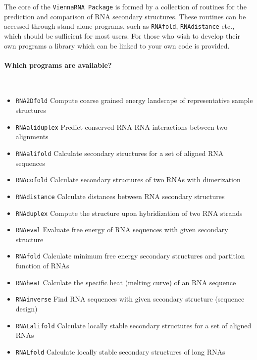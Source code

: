 \documentclass[]{article}
\let\oldparagraph\paragraph
\renewcommand{\paragraph}[1]{\oldparagraph{#1}\mbox{}}
\begin{document}
The core of the \texttt{ViennaRNA\ Package} is formed by a collection
of routines for the prediction and comparison of RNA secondary
structures.  These routines can be accessed through stand-alone
programs, such as \texttt{RNAfold}, \texttt{RNAdistance} etc., which
should be sufficient for most users. For those who wish to develop
their own programs a library which can be linked to your own code is
provided.

\paragraph{Which programs are available?}\\
\begin{itemize}
\item \texttt{RNA2Dfold} Compute coarse grained energy landscape of representative
sample structures \\
\item \texttt{RNAaliduplex} Predict conserved RNA-RNA interactions
between two alignments\\
\item \texttt{RNAalifold} Calculate secondary structures for a set of aligned RNA sequences\\
\item \texttt{RNAcofold} Calculate secondary structures of two RNAs with dimerization\\
\item \texttt{RNAdistance} Calculate distances between RNA secondary structures \\
\item \texttt{RNAduplex} Compute the structure upon hybridization of two RNA strands\\
\item \texttt{RNAeval} Evaluate free energy of RNA sequences with given secondary structure\\
\item \texttt{RNAfold} Calculate minimum free energy secondary structures and partition function of RNAs\\
\item \texttt{RNAheat} Calculate the specific heat (melting curve) of an RNA sequence
\item \texttt{RNAinverse} Find RNA sequences with given secondary structure (sequence design)
\item \texttt{RNALalifold} Calculate locally stable secondary structures for a set of aligned RNAs\\
\item \texttt{RNALfold} Calculate locally stable secondary structures of long RNAs\\

\end{itemize}
\end{document}

